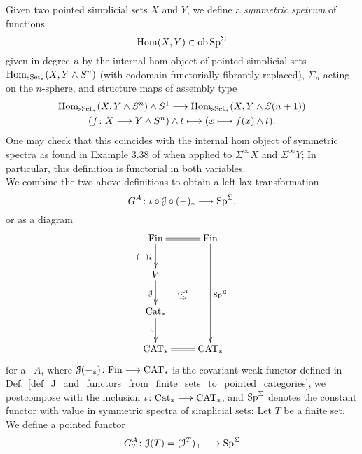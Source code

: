     \begin{defn}\label{def_left_lax_transform_G^A}
      Given two pointed simplicial sets $X$ and $Y$, we define a \emph{symmetric
      spetrum} of functions 
      \begin{displaymath}
        \operatorname{Hom}(X,Y) \in \operatorname{ob} \mathrm{Sp}^\Sigma
      \end{displaymath}
      given in degree $n$ by the internal hom-object of pointed simplicial sets
      $\operatorname{Hom}_{\mathrm{sSet}_*}(X,Y \wedge S^n)$ (with codomain functorially fibrantly
      replaced), $\Sigma_n$ acting on the $n$-sphere, and structure maps of
      assembly type
      \begin{gather*}
      \operatorname{Hom}_{\mathrm{sSet}_*}(X,Y \wedge S^n) \wedge S^1 \longrightarrow \operatorname{Hom}_{\mathrm{sSet}_*}(X,Y \wedge S(n+1))\\
      (f \colon X \longrightarrow Y \wedge S^n) \wedge t \longmapsto (x \longmapsto f(x) \wedge t).
      \end{gather*}
      One may check that this coincides with the internal hom object of
      symmetric spectra as found in Example 3.38 of \cite{schwede2012symmetric}
      when applied to $\Sigma^\infty X$ and $\Sigma^\infty Y$; In particular,
      this definition is functorial in both variables.\\
      We combine the two above definitions to obtain a left lax transformation
      \begin{displaymath}
        G^A \colon \iota \circ \mathcal{J} \circ (-)_* \longrightarrow \mathrm{Sp}^\Sigma,
      \end{displaymath}
      or as a diagram
      \begin{displaymath}
        \xymatrix{
          \Fin \ar@{=}[r] \ar[d]_{(-)_*} \ar@{}[rddd]|{\overset{G^A}{\Rightarrow}} & \Fin \ar[ddd]^{\Sp^{\Sigma}} \\
          V \ar[d]_{\cJ} & \\
          \Cat_* \ar[d]_{\iota} & \\
          \CAT_* \ar@{=}[r] & \CAT_*
        }
      \end{displaymath}
      for a \hring~$A$, where $\mathcal{J}(-_*) \colon \mathrm{Fin} \longrightarrow \mathrm{CAT}_*$ is the covariant
      weak functor defined in
      Def.~\ref{def_J_and_functors_from_finite_sets_to_pointed_categories}, we
      postcompose with the inclusion $\iota \colon \mathrm{Cat}_* \longrightarrow \mathrm{CAT}_*$, and
      $\mathrm{Sp}^\Sigma$ denotes the constant functor with value in symmetric spectra of
      simplicial sets: Let $T$ be a finite set. We define a pointed functor
      \begin{gather*}
        G^A_T \colon \cJ(T) = (\cI^T)_+ \to \SpS \\

\end{gather*}
\end{defn}
